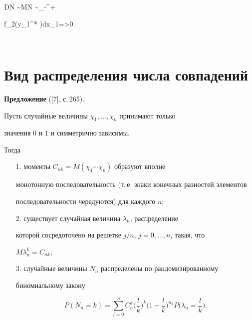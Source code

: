 DN \sim MN \sim \int_{-\infty}^{+\infty}


{f_2(y_1^* )}dx_1=\lambda>0.


$$





\section{Вид распределения числа совпадений}





{\bf Предложение} ([7], с.\,265). {\it


Пусть случайные величины $\chi_1,\dotsc,\chi_n$ принимают только


значения $0$ и $1$ и симметрично зависимы.


Тогда


\begin{itemize}


\item[1.] моменты $C_{nk}=M(\chi_1\dotsb\chi_k)$ образуют вполне


монотонную последовательность $($т.\,е. знаки конечных разностей элементов


последовательности чередуются) для каждого $n;$


\item[2.] существует случайная величина $\lambda_n$, распределение


которой сосредоточено на решетке $j/n$, $j=0,\dotsc,n$, такая, что


$M\lambda_n^k=C_{nk};$


\item[3.] случайные величины $N_n$ распределены по рандомизированному


биномиальному закону


$$


P(N_n=k)=\sum_{l=0}^{n}C_n^k\bigg(\frac{l}{k}\bigg)^k


\bigg(1-\frac{l}{k}\bigg)^{n_k}


P\bigg(\lambda_n=\frac{l}{k}\bigg).


$$


\end{itemize}


}





